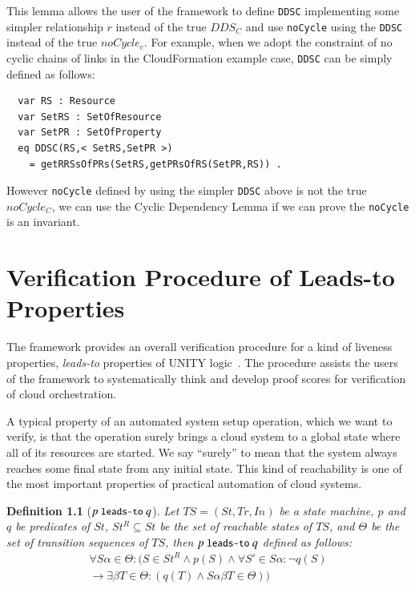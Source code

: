 \documentclass[12pt]{report}
\newtheorem{definition}{Definition}
\newcommand{\ra}{\rightarrow}
\newcommand{\mbstt}[1]{\mbox{\small{\tt {#1}}}}
\newcommand{\ul}{\underline}
\begin{document}
This lemma allows the user of the framework to define {\tt DDSC}
implementing some simpler relationship $r$ instead of the true $DDS_C$
and use {\tt noCycle} using the {\tt DDSC} instead of the true
$noCycle_c$. For example, when we adopt the constraint of no cyclic
chains of links in the CloudFormation example case, {\tt DDSC} can be
simply defined as follows:
\begin{verbatim}
  var RS : Resource
  var SetRS : SetOfResource
  var SetPR : SetOfProperty
  eq DDSC(RS,< SetRS,SetPR >)
    = getRRSsOfPRs(SetRS,getPRsOfRS(SetPR,RS)) .
\end{verbatim}
However {\tt noCycle} defined by using the simpler {\tt DDSC} above is
 not the true $noCycle_C$, we can use the Cyclic Dependency Lemma if
 we can prove the {\tt noCycle} is an invariant.

\chapter{Verification Procedure of Leads-to Properties}
\label{chap:verification}
The framework provides an overall verification procedure for a kind of
liveness properties, {\it leads-to} properties of UNITY
logic~\cite{DBLP:books/daglib/0067338}.  The procedure assists the
users of the framework to systematically think and develop proof
scores for verification of cloud orchestration.

A typical property of an automated system setup operation, which we
want to verify, is that the operation surely brings a cloud system to
a global state where all of its resources are started.  We say ``surely''
to mean that the system always reaches some final state from any
initial state. This kind of reachability is one of the most important
properties of practical automation of cloud systems.

\begin{definition}[$p~\mbstt{leads-to}~q$]
  Let $TS=(St,Tr,In)$ be a state machine, $p$ and $q$ be predicates of
  $St$, $St^R\subseteq St$ be the set of reachable states of $TS$, and
  $\Theta$ be the set of transition sequences of $TS$, then
  \ul{$p~\mbstt{leads-to}~q$} defined as follows:
  \begin{eqnarray*}
  \forall S\alpha\in \Theta: (S\in St^R \land p(S) \land
  \forall S'\in S\alpha: \neg q(S)\\
  \ra \exists \beta T\in \Theta:(q(T) \land S\alpha\beta T\in \Theta))
  \end{eqnarray*}
\end{definition}
\end{document}
